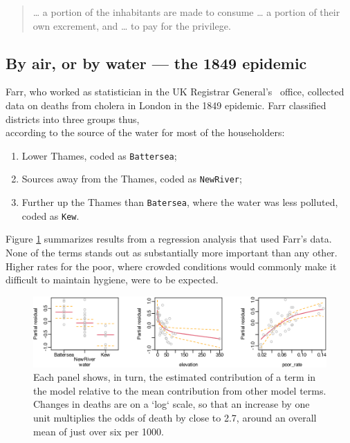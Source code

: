 \documentclass[
  10pt,
  b5paper]{book}
\providecommand{\tightlist}{%
  \setlength{\itemsep}{0pt}\setlength{\parskip}{0pt}}
\begin{document}
\begin{quote}
\ldots{} a portion of the inhabitants are made to consume
\ldots{} a portion of their own excrement, and \ldots{} to pay
for the privilege.
\end{quote}

\hypertarget{by-air-or-by-water-the-1849-epidemic}{%
\subsection*{By air, or by water --- the 1849 epidemic}\label{by-air-or-by-water-the-1849-epidemic}}

Farr, who worked as statistician in the UK Registrar General's~
office, collected data on deaths from cholera in London in the
1849 epidemic. Farr classified districts into three groups thus,\\
according to the source of the water for most of the householders:

\begin{enumerate}
\def\labelenumi{\arabic{enumi})}
\tightlist
\item
  Lower Thames, coded as \texttt{Battersea};\\
\item
  Sources away from the Thames, coded as \texttt{NewRiver};\\
\item
  Further up the Thames than \texttt{Batersea}, where the water was
  less polluted, coded as \texttt{Kew}.
\end{enumerate}

Figure \ref{fig:Farr} summarizes results from a regression
analysis that used Farr's data. None of the terms stands out
as substantially more important than any other. Higher rates
for the poor, where crowded conditions would commonly make
it difficult to maintain hygiene, were to be expected.

\begin{figure}

{\centering \includegraphics[width=1\linewidth]{08-observational_files/figure-latex/Farr-1} 

}

\caption{Each panel shows, in turn, the estimated contribution
of a term in the model relative to the mean contribution from 
other model terms. Changes in deaths are on a `log` scale, so 
that an increase by one unit multiplies the odds of death by 
close to 2.7, around an overall mean of just over six per 1000.
}\label{fig:Farr}
\end{figure}
\end{document}
